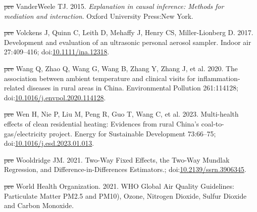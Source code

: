 \documentclass[
  letterpaper,
  DIV=11,
  numbers=noendperiod]{scrartcl}
\newlength{\cslhangindent}
\newenvironment{CSLReferences}[2] %
 {\begin{list}{}{%
  \setlength{\itemindent}{0pt} %
  \setlength{\leftmargin}{0pt} %
  \setlength{\parsep}{0pt} %
  \ifodd #1
   \setlength{\leftmargin}{\cslhangindent} %
   \setlength{\itemindent}{-1\cslhangindent} %
  \fi
  \setlength{\itemsep}{#2\baselineskip}}} %
 {\end{list}} %
\providecommand{\DIFdel}[1]{{\protect\color{red}\sout{#1}}}                      %
\providecommand{\DIFaddbegin}{} %
\providecommand{\DIFaddend}{} %
\providecommand{\DIFdelbegin}{} %
\providecommand{\DIFdelend}{} %
\newcommand{\DIFscaledelfig}{0.5}
\newlength{\DIFdelgraphicswidth} %
\newlength{\DIFdelgraphicsheight} %
\newcommand{\DIFaddincludegraphics}[2][]{{\color{blue}\fbox{\DIFOincludegraphics[#1]{#2}}}} %
\newcommand{\DIFdelincludegraphics}[2][]{%
\sbox{\DIFdelgraphicsbox}{\DIFOincludegraphics[#1]{#2}}%
\settoboxwidth{\DIFdelgraphicswidth}{\DIFdelgraphicsbox} %
\settoboxtotalheight{\DIFdelgraphicsheight}{\DIFdelgraphicsbox} %
\scalebox{\DIFscaledelfig}{%
\parbox[b]{\DIFdelgraphicswidth}{\usebox{\DIFdelgraphicsbox}\\[-\baselineskip] \rule{\DIFdelgraphicswidth}{0em}}\llap{\resizebox{\DIFdelgraphicswidth}{\DIFdelgraphicsheight}{%
\setlength{\unitlength}{\DIFdelgraphicswidth}%
\begin{picture}(1,1)%
\thicklines\linethickness{2pt} %
{\color[rgb]{1,0,0}\put(0,0){\framebox(1,1){}}}%
{\color[rgb]{1,0,0}\put(0,0){\line( 1,1){1}}}%
{\color[rgb]{1,0,0}\put(0,1){\line(1,-1){1}}}%
\end{picture}%
}\hspace*{3pt}}} %
} %
\DeclareRobustCommand{\DIFaddbegin}{\DIFOaddbegin \let\includegraphics\DIFaddincludegraphics} %
\DeclareRobustCommand{\DIFaddend}{\DIFOaddend \let\includegraphics\DIFOincludegraphics} %
\DeclareRobustCommand{\DIFdelbegin}{\DIFOdelbegin \let\includegraphics\DIFdelincludegraphics} %
\DeclareRobustCommand{\DIFdelend}{\DIFOaddend \let\includegraphics\DIFOincludegraphics} %
\begin{document}
\begin{CSLReferences}{1}{1}
\DIFdelbegin %
\DIFdel{pre}%
\DIFdelend \DIFaddbegin {}
\DIFaddend VanderWeele TJ. 2015. \emph{Explanation in causal inference: Methods for
mediation and interaction}. Oxford University Press:New York.

\DIFdelbegin %
\DIFdel{pre}%
\DIFdelend \DIFaddbegin {}
\DIFaddend Volckens J, Quinn C, Leith D, Mehaffy J, Henry CS, Miller-Lionberg D.
2017. Development and evaluation of an ultrasonic personal aerosol
sampler. Indoor air 27:409--416;
doi:\href{https://doi.org/10.1111/ina.12318}{10.1111/ina.12318}.

\DIFdelbegin %
\DIFdel{pre}%
\DIFdelend \DIFaddbegin {}
\DIFaddend Wang Q, Zhao Q, Wang G, Wang B, Zhang Y, Zhang J, et al. 2020. The
association between ambient temperature and clinical visits for
inflammation-related diseases in rural areas in {China}. Environmental
Pollution 261:114128;
doi:\href{https://doi.org/10.1016/j.envpol.2020.114128}{10.1016/j.envpol.2020.114128}.

\DIFdelbegin %
\DIFdel{pre}%
\DIFdelend \DIFaddbegin {}
\DIFaddend Wen H, Nie P, Liu M, Peng R, Guo T, Wang C, et al. 2023. Multi-health
effects of clean residential heating: {Evidences} from rural {China}'s
coal-to-gas/electricity project. Energy for Sustainable Development
73:66--75;
doi:\href{https://doi.org/10.1016/j.esd.2023.01.013}{10.1016/j.esd.2023.01.013}.

\DIFdelbegin %
\DIFdel{pre}%
\DIFdelend \DIFaddbegin {}
\DIFaddend Wooldridge JM. 2021. Two-{Way Fixed Effects}, the {Two-Way Mundlak
Regression}, and {Difference-in-Differences Estimators}.;
doi:\href{https://doi.org/10.2139/ssrn.3906345}{10.2139/ssrn.3906345}.

\DIFdelbegin %
\DIFdel{pre}%
\DIFdelend \DIFaddbegin {}
\DIFaddend World Health Organization. 2021. {WHO Global Air Quality Guidelines}:
{Particulate Matter PM2}.5 and {PM10}), {Ozone}, {Nitrogen Dioxide},
{Sulfur Dioxide} and {Carbon Monoxide}.


\end{CSLReferences}
\end{document}
